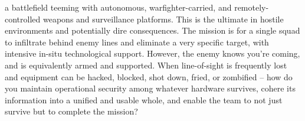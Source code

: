 %
%
%

a battlefield teeming with autonomous, warfighter-carried, and remotely-controlled weapons and surveillance platforms.
This is the ultimate in hostile environments and potentially dire consequences.
The mission is for a single squad to infiltrate behind enemy lines and eliminate a very specific target, with intensive in-situ technological support.
However, the enemy knows you're coming, and is equivalently armed and supported.
When line-of-sight is frequently lost and equipment can be hacked, blocked, shot down, fried, or zombified -- how do you maintain operational security among whatever hardware survives, cohere its information into a unified and usable whole, and enable the team to not just survive but to complete the mission?
